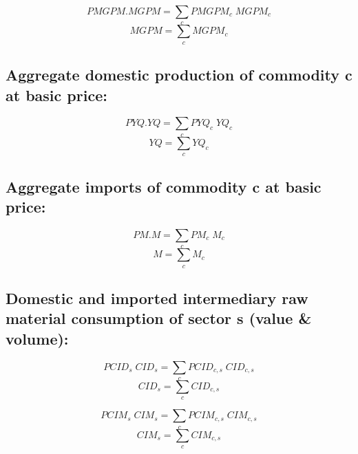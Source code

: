 \documentclass[12pt]{article}
\numberwithin{equation}{section}
\begin{document}
\begin{dmath}
PMGPM . MGPM = \sum_{c} PMGPM_{c} \; MGPM_{c}
\end{dmath}
\begin{dmath}
MGPM = \sum_{c} MGPM_{c}
\end{dmath}



\subsection{ Aggregate domestic production of commodity c at basic price:}



\begin{dmath}
PYQ . YQ = \sum_{c} PYQ_{c} \; YQ_{c}
\end{dmath}
\begin{dmath}
YQ = \sum_{c} YQ_{c}
\end{dmath}



\subsection{Aggregate imports of commodity c at basic price:}



\begin{dmath}
PM . M = \sum_{c} PM_{c} \; M_{c}
\end{dmath}
\begin{dmath}
M = \sum_{c} M_{c}
\end{dmath}



\subsection{Domestic and imported intermediary raw material consumption of sector s (value \& volume):}



\begin{dmath}
PCID_{s} \; CID_{s} = \sum_{c} PCID_{c, s} \; CID_{c, s}
\end{dmath}
\begin{dmath}
CID_{s} = \sum_{c} CID_{c, s}
\end{dmath}

\begin{dmath}
PCIM_{s} \; CIM_{s} = \sum_{c} PCIM_{c, s} \; CIM_{c, s}
\end{dmath}
\begin{dmath}
CIM_{s} = \sum_{c} CIM_{c, s}
\end{dmath}
\end{document}
